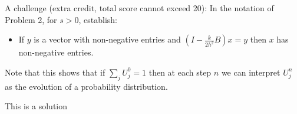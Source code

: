 \documentclass[12pt]{report}
\begin{document}


\begin{problem}
    A challenge (extra credit, total score cannot exceed 20):  In the notation of Problem 2, for $s > 0$, establish:
  \begin{itemize}
  \item If $y$ is a vector with non-negative entries and $\left( I - \frac{k}{2h^2}B \right) x = y$ then $x$ has non-negative entries.
  \end{itemize}
  Note that this shows that if $\sum_j U_j^0 =1$ then at each step $n$ we can interpret $U_j^n$ as the evolution of a probability distribution.
\end{problem}

\begin{solution}
    \noindent
    This is a solution
\end{solution}

\newpage
\end{document}
